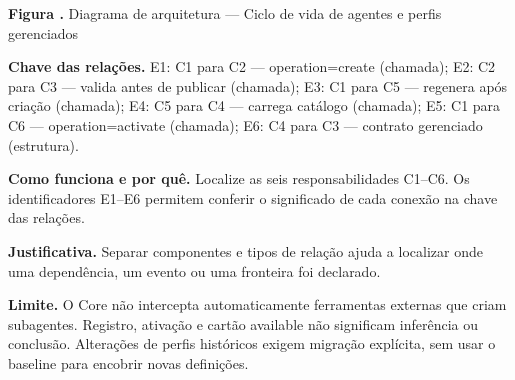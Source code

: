 {\small\textbf{Figura \thefigure.} Diagrama de arquitetura --- Ciclo de vida de agentes e perfis gerenciados}\par\smallskip
{\footnotesize\textbf{Chave das relações.} E1: C1 para C2 --- operation=create (chamada); E2: C2 para C3 --- valida antes de publicar (chamada); E3: C1 para C5 --- regenera após criação (chamada); E4: C5 para C4 --- carrega catálogo (chamada); E5: C1 para C6 --- operation=activate (chamada); E6: C4 para C3 --- contrato gerenciado (estrutura).}\par\smallskip
\noindent\textbf{Como funciona e por quê.} Localize as seis responsabilidades C1--C6. Os identificadores E1--E6 permitem conferir o significado de cada conexão na chave das relações.\par
\noindent\textbf{Justificativa.} Separar componentes e tipos de relação ajuda a localizar onde uma dependência, um evento ou uma fronteira foi declarado.\par
\noindent\textbf{Limite.} O Core não intercepta automaticamente ferramentas externas que criam subagentes. Registro, ativação e cartão available não significam inferência ou conclusão. Alterações de perfis históricos exigem migração explícita, sem usar o baseline para encobrir novas definições.\par\smallskip
{}
